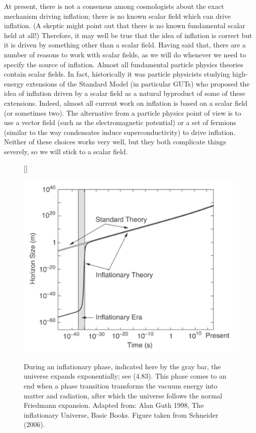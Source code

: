 \documentclass[a4paper,11pt]{article}
\begin{document}
{\noindent}At present, there is not a consensus among cosmologists about the exact mechanism driving inflation; there is no known scalar field which can drive inflation. (A skeptic might point out that there is no known fundamental scalar held at all!) Therefore, it may well be true that the idea of inflation is correct but it is driven by something other than a scalar field. Having said that, there are a number of reasons to work with scalar fields, as we will do whenever we need to specify the source of inflation. Almost all fundamental particle physics theories contain scalar fields. In fact, historically it was particle physicists studying high-energy extensions of the Standard Model (in particular GUTs) who proposed the idea of inflation driven by a scalar field as a natural byproduct of some of these extensions. Indeed, almost all current work on inflation is based on a scalar field (or sometimes two). The alternative from a particle physics point of view is to use a vector field (such as the electromagnetic potential) or a set of fermions (similar to the way condensates induce superconductivity) to drive inflation. Neither of these choices works very well, but they both complicate things severely, so we will stick to a scalar field.

\begin{figure}[h]
    [\FBwidth]
    {\caption{\footnotesize{During an inflationary phase, indicated here by the gray bar, the universe expands exponentially; see (4.83). This phase comes to an end when a phase transition transforms the vacuum energy into matter and radiation, after which the universe follows the normal Friedmann expansion. Adapted from: Alan Guth 1998, The inflationary Universe, Basic Books. Figure taken from Schneider (2006).}}
    \label{fig:inflation}}
    {\includegraphics[width=12cm]{figures/Inflation.png}}
\end{figure}
\end{document}
